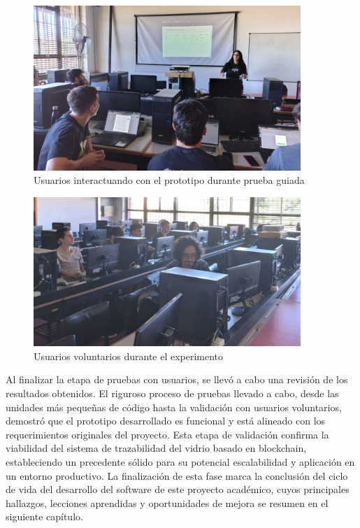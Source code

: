\begin{figure}[!htb]
\centering
\includegraphics[width=0.9\textwidth]{Figures/uat-1.jpg}
\caption{Usuarios interactuando con el prototipo durante prueba guiada}
\label{fig:uat-picture-1}
\end{figure}

\begin{figure}[!htb]
\centering
\includegraphics[width=0.9\textwidth]{Figures/uat-2.jpg}
\caption{Usuarios voluntarios durante el experimento}
\label{fig:uat-picture-2}
\end{figure}

Al finalizar la etapa de pruebas con usuarios, se llevó a cabo una revisión de los resultados obtenidos. El riguroso proceso de pruebas llevado a cabo, desde las unidades más pequeñas de código hasta la validación con usuarios voluntarios, demostró que el prototipo desarrollado es funcional y está alineado con los requerimientos originales del proyecto. Esta etapa de validación confirma la viabilidad del sistema de trazabilidad del vidrio basado en blockchain, estableciendo un precedente sólido para su potencial escalabilidad y aplicación en un entorno productivo. La finalización de esta fase marca la conclusión del ciclo de vida del desarrollo del software de este proyecto académico, cuyos principales hallazgos, lecciones aprendidas y oportunidades de mejora se resumen en el siguiente capítulo.
